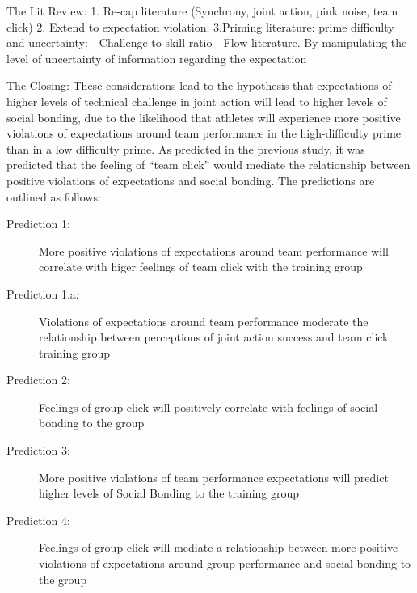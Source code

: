 \documentclass[english]{article}\usepackage[]{graphicx}\usepackage[]{color}
\begin{document}
The Lit Review:
1. Re-cap literature (Synchrony, joint action, pink noise, team click)
2. Extend to expectation violation:
3.Priming literature: prime difficulty and uncertainty:
- Challenge to skill ratio - Flow literature.
By manipulating the level of uncertainty of information regarding the expectation






The Closing:
These considerations lead to the hypothesis that expectations of higher levels of technical challenge in joint action will lead to higher levels of social bonding, due to the likelihood that athletes will experience more positive violations of expectations around team performance in the high-difficulty prime than in a low difficulty prime.  As predicted in the previous study, it was predicted that the feeling of ``team click'' would mediate the relationship between positive violations of expectations and social bonding.  The predictions are outlined as follows:
\begin{description}
\item[Prediction 1:] More positive violations of expectations around team performance will correlate with higer feelings of team click with the training group
\item[Prediction 1.a:] Violations of expectations around team performance moderate the relationship between perceptions of joint action success and team click training group
\item[Prediction 2:] Feelings of group click will positively correlate with feelings of social bonding to the group
\item[Prediction 3:] More positive violations of team performance expectations will predict higher levels of Social Bonding to the training group
\item[Prediction 4:] Feelings of group click will mediate a relationship between more positive violations of expectations around group performance and social bonding to the group
\end{description}
\end{document}
